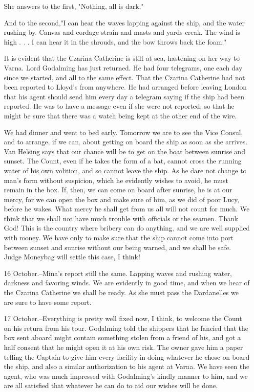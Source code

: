 She answers to the first, "Nothing, all is dark." 

And to the second,"I can hear the waves lapping against the ship, and the water rushing by. Canvas and cordage strain and masts and yards creak. The wind is high . . . I can hear it in the shrouds, and the bow throws back the foam." 

It is evident that the Czarina Catherine is still at sea, hastening on her way to Varna. Lord Godalming has just returned. He had four telegrams, one each day since we started, and all to the same effect. That the Czarina Catherine had not been reported to Lloyd's from anywhere. He had arranged before leaving London that his agent should send him every day a telegram saying if the ship had been reported. He was to have a message even if she were not reported, so that he might be sure that there was a watch being kept at the other end of the wire. 

We had dinner and went to bed early. Tomorrow we are to see the Vice Consul, and to arrange, if we can, about getting on board the ship as soon as she arrives. Van Helsing says that our chance will be to get on the boat between sunrise and sunset. The Count, even if he takes the form of a bat, cannot cross the running water of his own volition, and so cannot leave the ship. As he dare not change to man's form without suspicion, which he evidently wishes to avoid, he must remain in the box. If, then, we can come on board after sunrise, he is at our mercy, for we can open the box and make sure of him, as we did of poor Lucy, before he wakes. What mercy he shall get from us all will not count for much. We think that we shall not have much trouble with officials or the seamen. Thank God! This is the country where bribery can do anything, and we are well supplied with money. We have only to make sure that the ship cannot come into port between sunset and sunrise without our being warned, and we shall be safe. Judge Moneybag will settle this case, I think! 

16 October.--Mina's report still the same. Lapping waves and rushing water, darkness and favoring winds. We are evidently in good time, and when we hear of the Czarina Catherine we shall be ready. As she must pass the Dardanelles we are sure to have some report. 

17 October.--Everything is pretty well fixed now, I think, to welcome the Count on his return from his tour. Godalming told the shippers that he fancied that the box sent aboard might contain something stolen from a friend of his, and got a half consent that he might open it at his own risk. The owner gave him a paper telling the Captain to give him every facility in doing whatever he chose on board the ship, and also a similar authorization to his agent at Varna. We have seen the agent, who was much impressed with Godalming's kindly manner to him, and we are all satisfied that whatever he can do to aid our wishes will be done. 

